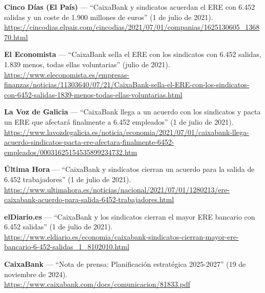 \begin{enumerate}[label={[\arabic*]}]

  \item \textbf{Cinco Días (El País)} --- ``CaixaBank y sindicatos acuerdan
        el ERE con 6.452 salidas y un coste de 1.900 millones de euros''
        (1 de julio de 2021).\\
        \url{https://cincodias.elpais.com/cincodias/2021/07/01/companias/1625130605_136870.html}

  \item \textbf{El Economista} --- ``CaixaBank sella el ERE con los sindicatos
        con 6.452 salidas, 1.839 menos, todas ellas voluntarias''
        (julio de 2021).\\
        \url{https://www.eleconomista.es/empresas-finanzas/noticias/11303640/07/21/CaixaBank-sella-el-ERE-con-los-sindicatos-con-6452-salidas-1839-menos-todas-ellas-voluntarias.html}

  \item \textbf{La Voz de Galicia} --- ``CaixaBank llega a un acuerdo con
        los sindicatos y pacta un ERE que afectará finalmente a 6.452
        empleados'' (1 de julio de 2021).\\
        \url{https://www.lavozdegalicia.es/noticia/economia/2021/07/01/caixabank-llega-acuerdo-sindicatos-pacta-ere-afectara-finalmente-6452-empleados/00031625154535899234732.htm}

  \item \textbf{Última Hora} --- ``CaixaBank y sindicatos cierran un acuerdo
        para la salida de 6.452 trabajadores'' (1 de julio de 2021).\\
        \url{https://www.ultimahora.es/noticias/nacional/2021/07/01/1280213/ere-caixabank-acuerdo-para-salida-6452-trabajadores.html}

  \item \textbf{elDiario.es} --- ``CaixaBank y los sindicatos cierran el
        mayor ERE bancario con 6.452 salidas'' (1 de julio de 2021).\\
        \url{https://www.eldiario.es/economia/caixabank-sindicatos-cierran-mayor-ere-bancario-6-452-salidas_1_8102010.html}

  \item \textbf{CaixaBank} --- ``Nota de prensa: Planificación estratégica 2025-2027'' (19 de noviembre de 2024).\\
        \url{https://www.caixabank.com/docs/comunicacion/81833.pdf}

\end{enumerate}

